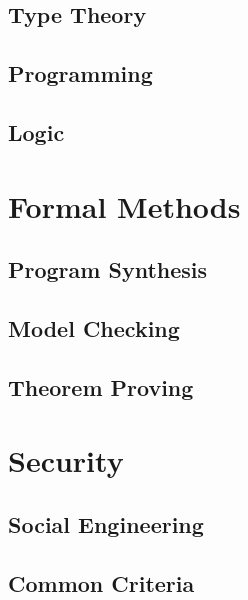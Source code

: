 \documentclass{book}
\begin{document}
  \chapter{Type Theory}\label{sec:sd:typetheory}
  

  \chapter{Programming}


  \chapter{Logic}

\part{Formal Methods}

  \chapter{Program Synthesis} 

  \chapter{Model Checking} 
    

  \chapter{Theorem Proving} 
   

\part{Security}

  \chapter{Social Engineering}

  \chapter{Common Criteria}
\end{document}
